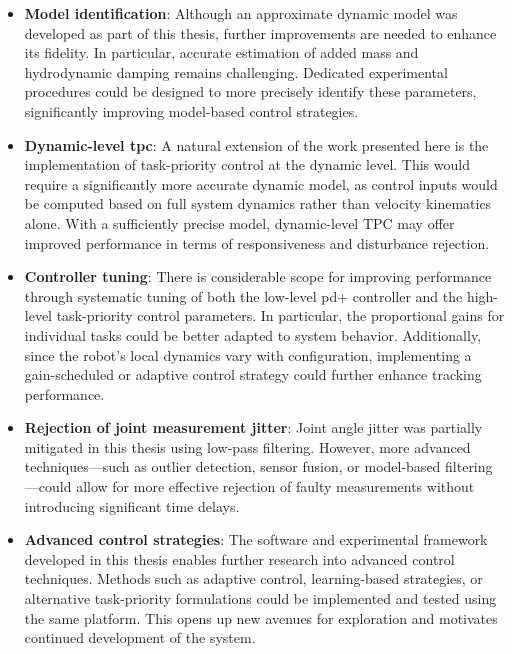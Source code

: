 \begin{itemize}
    \item \textbf{Model identification}: Although an approximate dynamic model was developed as part of this thesis, further improvements are needed to enhance its fidelity. In particular, accurate estimation of added mass and hydrodynamic damping remains challenging. Dedicated experimental procedures could be designed to more precisely identify these parameters, significantly improving model-based control strategies.

    \item \textbf{Dynamic-level \gls{tpc}}: A natural extension of the work presented here is the implementation of task-priority control at the dynamic level. This would require a significantly more accurate dynamic model, as control inputs would be computed based on full system dynamics rather than velocity kinematics alone. With a sufficiently precise model, dynamic-level TPC may offer improved performance in terms of responsiveness and disturbance rejection.

    \item \textbf{Controller tuning}: There is considerable scope for improving performance through systematic tuning of both the low-level \gls{pd+} controller and the high-level task-priority control parameters. In particular, the proportional gains for individual tasks could be better adapted to system behavior. Additionally, since the robot's local dynamics vary with configuration, implementing a gain-scheduled or adaptive control strategy could further enhance tracking performance.

    \item \textbf{Rejection of joint measurement jitter}: Joint angle jitter was partially mitigated in this thesis using low-pass filtering. However, more advanced techniques—such as outlier detection, sensor fusion, or model-based filtering—could allow for more effective rejection of faulty measurements without introducing significant time delays.

    \item \textbf{Advanced control strategies}: The software and experimental framework developed in this thesis enables further research into advanced control techniques. Methods such as adaptive control, learning-based strategies, or alternative task-priority formulations could be implemented and tested using the same platform. This opens up new avenues for exploration and motivates continued development of the system.
\end{itemize}

